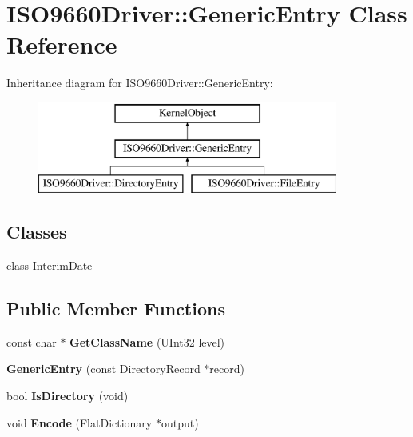 \hypertarget{class_i_s_o9660_driver_1_1_generic_entry}{}\section{I\+S\+O9660\+Driver\+:\+:Generic\+Entry Class Reference}
\label{class_i_s_o9660_driver_1_1_generic_entry}
Inheritance diagram for I\+S\+O9660\+Driver\+:\+:Generic\+Entry\+:\begin{figure}[H]
\begin{center}
\leavevmode
\includegraphics[height=3.000000cm]{class_i_s_o9660_driver_1_1_generic_entry}
\end{center}
\end{figure}
\subsection*{Classes}
\begin{DoxyCompactItemize}
\item 
class \hyperlink{class_i_s_o9660_driver_1_1_generic_entry_1_1_interim_date}{Interim\+Date}
\end{DoxyCompactItemize}
\subsection*{Public Member Functions}
\begin{DoxyCompactItemize}
\item 
\mbox{\label{class_i_s_o9660_driver_1_1_generic_entry_a0c52498ba3b8d3ea4fc94917a189f644}} 
const char $\ast$ {\bfseries Get\+Class\+Name} (U\+Int32 level)
\item 
\mbox{\label{class_i_s_o9660_driver_1_1_generic_entry_adb6933e6011e07c57785824d45b63962}} 
{\bfseries Generic\+Entry} (const Directory\+Record $\ast$record)
\item 
\mbox{\label{class_i_s_o9660_driver_1_1_generic_entry_ab48b924fed6721e2063e748bb92b2cf2}} 
bool {\bfseries Is\+Directory} (void)
\item 
\mbox{\label{class_i_s_o9660_driver_1_1_generic_entry_abdf8c027359d53e1a6fdf1d8927789e0}} 
void {\bfseries Encode} (Flat\+Dictionary $\ast$output)
\end{DoxyCompactItemize}
